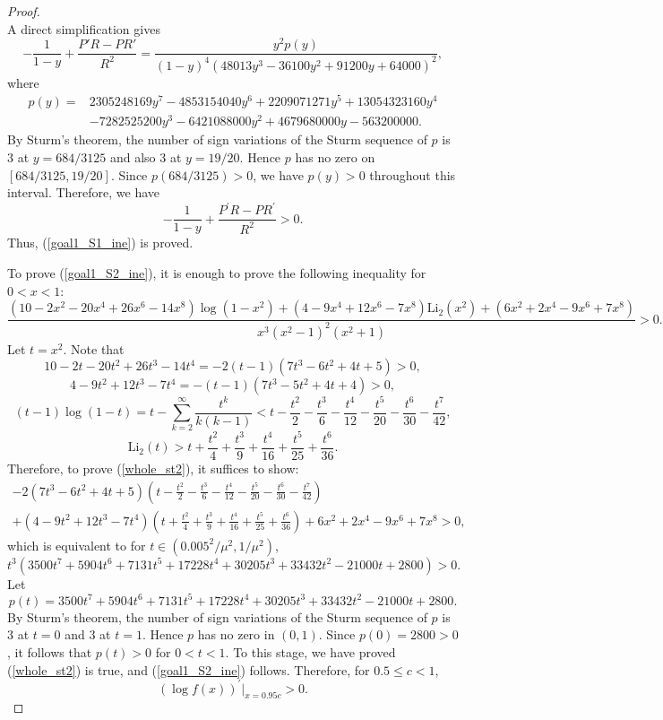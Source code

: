 ﻿\documentclass[10pt]{article}
\begin{document}
\begin{proof}
$$$$
A direct simplification gives
\[
-\frac{1}{1-y}+\frac{P'R-PR'}{R^2}
=
\frac{y^2 p(y)}{(1-y)^4(48013y^3-36100y^2+91200y+64000)^2},
\]
where
\[
\begin{aligned}
p(y)=&2305248169y^7-4853154040y^6+2209071271y^5
+13054323160y^4\\
&-7282525200y^3-6421088000y^2+4679680000y-563200000.
\end{aligned}
\]
By Sturm's theorem, the number of sign variations of the Sturm sequence
of $p$ is $3$ at $y=684/3125$ and also $3$ at $y=19/20$. Hence $p$
has no zero on $[684/3125,19/20]$. Since $p(684/3125)>0$, we have
$p(y)>0$ throughout this interval. Therefore, we have
$$-\frac{1}{1-y}+\frac{P^{'}R-PR^{'}}{R^2}>0.$$
Thus, (\ref{goal1_S1_ine}) is proved.

To prove (\ref{goal1_S2_ine}), it is enough to prove the following
inequality for $0<x<1$:
\begin{equation}
    \frac{(10-2x^2-20x^4+26x^6-14x^8)\log(1-x^2)+(4-9x^4+12x^6-7x^8)\text{Li}_2(x^2)+(6x^2 + 2x^4 - 9x^6 + 7x^8)}{x^3(x^2 - 1)^2(x^2 + 1)}>0.\label{whole_st2}
\end{equation}
Let $t=x^2$. Note that
$$10-2t-20t^2+26t^3-14t^4 = -2(t-1)(7t^3 - 6t^2 + 4t + 5)>0,
$$
$$4-9t^2+12t^3-7t^4 = -(t-1)(7t^3 - 5t^2 + 4t + 4)>0,
$$
$$(t-1)\log(1-t)=t-\sum_{k=2}^{\infty}\frac{t^k}{k(k-1)}<t-\frac{t^2}{2}-\frac{t^3}{6}-\frac{t^4}{12}-\frac{t^5}{20}-\frac{t^6}{30}-\frac{t^7}{42},
$$
$$\text{Li}_2(t)>t+\frac{t^2}{4}+\frac{t^3}{9}+\frac{t^4}{16}+\frac{t^5}{25}+\frac{t^6}{36}.
$$
Therefore, to prove (\ref{whole_st2}), it suffices to show:
\begin{align*}
    -2(7t^3 - 6t^2 + 4t + 5)(t-\frac{t^2}{2}-\frac{t^3}{6}-\frac{t^4}{12}-\frac{t^5}{20}-\frac{t^6}{30}-\frac{t^7}{42})\\
    +(4-9t^2+12t^3-7t^4)(t+\frac{t^2}{4}+\frac{t^3}{9}+\frac{t^4}{16}+\frac{t^5}{25}+\frac{t^6}{36})+6x^2 + 2x^4 - 9x^6 + 7x^8>0,
\end{align*}
which is equivalent to for $t\in(0.005^2/\mu^2, 1/\mu^2)$,
$$t^3(3500t^7 + 5904t^6 + 7131t^5 + 17228t^4 + 30205t^3 + 33432t^2 - 21000t + 2800
)>0.
$$
Let
\[
p(t)=3500t^7+5904t^6+7131t^5+17228t^4+30205t^3
+33432t^2-21000t+2800.
\]
By Sturm's theorem, the number of sign variations of the Sturm sequence
of $p$ is $3$ at $t=0$ and $3$ at $t=1$. Hence $p$ has no zero in
$(0,1)$. Since $p(0)=2800>0$, it follows that $p(t)>0$ for $0<t<1$. To this stage, we have proved (\ref{whole_st2}) is true, and (\ref{goal1_S2_ine}) follows. Therefore, for $0.5\leq c<1$,
$$(\log f(x))^{'}\bigg|_{x=0.95c}>0.
$$
\end{proof}
\end{document}
